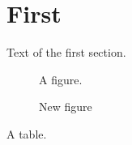 \documentclass{amsart}
\begin{document}
\listoffigures
\listoftables
\section{First}
Text of the first section.
\begin{figure}[h]
\centering A figure.
\caption{New figure}
\end{figure}
\begin{table}[h]
\centering A table.
\caption{New table}
\end{table}
\end{document}
